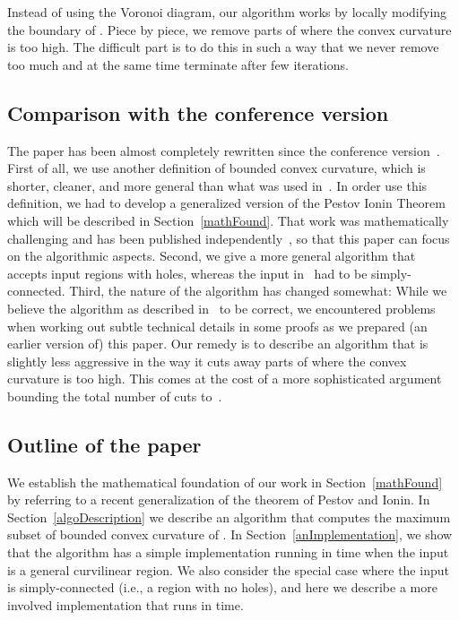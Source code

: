 \documentclass{article}
\begin{document}
Instead of using the Voronoi diagram, our algorithm works by locally modifying the boundary of .
Piece by piece, we remove parts of  where the convex curvature is too high.
The difficult part is to do this in such a way that we never remove too much and at the same time terminate after few iterations.

\subsection{Comparison with the conference version}

The paper has been almost completely rewritten since the conference version~\cite{abrahamsen_et_al:LIPIcs:2016:5896}.
First of all, we use another definition of bounded convex curvature, which is shorter, cleaner, and more general than what was used in~\cite{abrahamsen_et_al:LIPIcs:2016:5896}.
In order use this definition, we had to develop a generalized version of the Pestov Ionin Theorem which will be described in Section~\ref{mathFound}.
That work was mathematically challenging and has been published independently~\cite{aam2019disks}, so that this paper can focus on the algorithmic aspects.
Second, we give a more general algorithm that accepts input regions with holes, whereas the input in~\cite{abrahamsen_et_al:LIPIcs:2016:5896} had to be simply-connected.
Third, the nature of the algorithm has changed somewhat:
While we believe the algorithm as described in~\cite{abrahamsen_et_al:LIPIcs:2016:5896} to be correct, we encountered problems when working out subtle technical details in some proofs as we prepared (an earlier version of) this paper.
Our remedy is to describe an algorithm that is slightly less aggressive in the way it cuts away parts of  where the convex curvature is too high.
This comes at the cost of a more sophisticated argument bounding the total number of cuts to~.

\subsection{Outline of the paper}
We establish the mathematical foundation of our work in Section~\ref{mathFound} by referring to a recent generalization of the theorem of Pestov and Ionin.
In Section~\ref{algoDescription} we describe an algorithm that computes the maximum subset of bounded convex curvature of .
In Section~\ref{anImplementation}, we show that the algorithm has a simple implementation running in time  when the input is a general curvilinear region.
We also consider the special case where the input is simply-connected (i.e., a region with no holes), and here we describe a more involved implementation that runs in  time.
\end{document}
